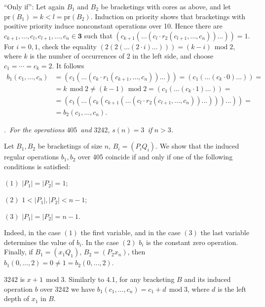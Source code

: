 \documentclass[a4paper,reqno]{amsart}\usepackage{amssymb,latexsym}
\theoremstyle{definition}
\theoremstyle{remark}
\numberwithin{equation}{section}
\numberwithin{theorem}{section}
\begin{document}
\textquotedblleft Only if\textquotedblright: Let again $B_{1}$ and $B_{2}$ be
bracketings with cores as above, and let $\mathrm{pr}(B_{1})=k<l=\mathrm{pr}(B_{2})$. Induction on priority shows that bracketings with positive priority
induce nonconstant operations over 10. Hence there are $c_{k+1},\ldots
,c_{l},\allowbreak c_{l+1},\ldots,c_{n}\in\mathbf{3}$ such that $(c_{k+1}(\ldots(c_{l}\cdot r_{2}(c_{l+1},\ldots,c_{n}))\ldots))=1$. For $i=0,1$, check
the equality $(2(2(\ldots(2\cdot i)\ldots)))=(k-i)\,\operatorname{mod}2$,
where $k$ is the number of occurrences of 2 in the left side, and choose
$c_{1}=\cdots=c_{k}=2$. It follows\begin{align*}
b_{1}(c_{1},\ldots,c_{n})  &  =(c_{1}(\ldots(c_{k}\cdot r_{1}(c_{k+1},\ldots,c_{n}))\ldots))=(c_{1}(\ldots(c_{k}\cdot0)\ldots))=\\
&  =k\,\operatorname{mod}2\neq(k-1)\,\operatorname{mod}2=(c_{1}(\ldots
(c_{k}\cdot1)\ldots))=\\
&  =(c_{1}(\ldots(c_{k}(c_{k+1}(\ldots(c_{l}\cdot r_{2}(c_{l+1},\ldots
,c_{n}))\ldots)))\ldots))=\\
&  =b_{2}(c_{1},\ldots,c_{n}).
\end{align*}

\bigskip

.\textit{\ For the operations }405\textit{\ and }3242\textit{,
}$s(n)=3$\textit{\ if }$n>3$\textit{.}

\smallskip

Let $B_{1},B_{2}$ be bracketings of size $n$, $B_{i}=(P_{i}Q_{i})$. We show
that the induced regular operations $b_{1},b_{2}$ over 405 coincide if and
only if one of the following conditions is satisfied:

\smallskip

\noindent$\left(  1\right)  $ $|P_{1}|=|P_{2}|=1$;

\noindent$\left(  2\right)  $ $1<|P_{1}|,|P_{2}|<n-1$;

\noindent$\left(  3\right)  $ $|P_{1}|=|P_{2}|=n-1$.

\smallskip

Indeed, in the case $\left(  1\right)  $ the first variable, and in the case
$\left(  3\right)  $ the last variable determines the value of $b_{i}$. In the
case $\left(  2\right)  $ $b_{i}$ is the constant zero operation. Finally, if
$B_{1}=(x_{1}Q_{1}),\,B_{2}=(P_{2}x_{n})$, then $b_{1}(0,\ldots,2)=0\neq
1=b_{2}(0,\ldots,2)$.

\smallskip

3242 is $x+1\,\operatorname{mod}3$. Similarly to 4.1, for any bracketing $B$
and its induced operation $b$ over 3242 we have $b_{1}(c_{1},\ldots
,c_{n})=c_{1}+d\,\operatorname{mod}3$, where $d$ is the left depth of $x_{1}$
in $B$.
\end{document}
